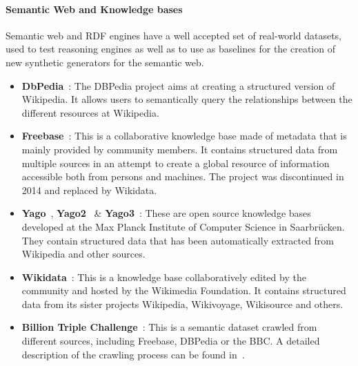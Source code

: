 \paragraph{Semantic Web and Knowledge bases}

Semantic web and RDF engines have a well accepted set of real-world datasets, used to
test reasoning engines as well as to use as baselines for the creation of new
synthetic generators for the semantic web.

\begin{itemize}
  \item \textbf{DbPedia}~\cite{Bizer:2009:DCP:1640541.1640848}: The DBPedia project aims at creating
    a structured version of Wikipedia. It allows users to semantically query the
    relationships between the different resources at Wikipedia.
  \item \textbf{Freebase}~\cite{bollacker2008freebase}: This is a collaborative knowledge base
    made of metadata that is mainly provided by community members. It contains
    structured data from multiple sources in an attempt to create a global
    resource of information accessible both from persons and machines. The
    project was discontinued in 2014 and replaced by Wikidata.
  \item \textbf{Yago}~\cite{suchanek2007yago}, \textbf{Yago2}~\cite{hoffart2013yago2} \&
    \textbf{Yago3}~\cite{mahdisoltani2013yago3}: These are
    open source knowledge bases developed at the Max Planck Institute of
    Computer Science in Saarbr\"ucken. They contain structured data  that has been automatically extracted
    from Wikipedia and other sources.
  \item \textbf{Wikidata}~\cite{vrandevcic2014wikidata}: This is a knowledge base
    collaboratively edited by the community and hosted by the Wikimedia
    Foundation. It contains structured data from its sister projects Wikipedia,
    Wikivoyage, Wikisource and others.
  \item \textbf{Billion Triple Challenge}~\cite{btc-2014}: This is a semantic dataset
    crawled from different sources, including Freebase, DBPedia or the BBC. A
    detailed description of the crawling process can be found in~\cite{kafer2012towards}.
\end{itemize}


